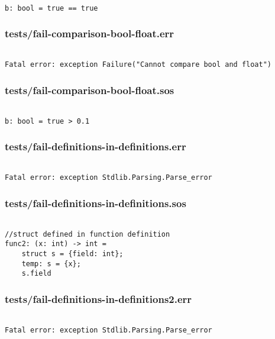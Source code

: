 \documentclass[main.tex]{subfiles}
\begin{document}
\begin{lstlisting}

b: bool = true == true
\end{lstlisting}

\subsubsection{tests/fail-comparison-bool-float.err}

\begin{lstlisting}

Fatal error: exception Failure("Cannot compare bool and float")
\end{lstlisting}

\subsubsection{tests/fail-comparison-bool-float.sos}

\begin{lstlisting}

b: bool = true > 0.1
\end{lstlisting}

\subsubsection{tests/fail-definitions-in-definitions.err}

\begin{lstlisting}

Fatal error: exception Stdlib.Parsing.Parse_error
\end{lstlisting}

\subsubsection{tests/fail-definitions-in-definitions.sos}

\begin{lstlisting}

//struct defined in function definition
func2: (x: int) -> int = 
    struct s = {field: int};
    temp: s = {x};
    s.field
\end{lstlisting}

\subsubsection{tests/fail-definitions-in-definitions2.err}

\begin{lstlisting}

Fatal error: exception Stdlib.Parsing.Parse_error
\end{lstlisting}
\end{document}
